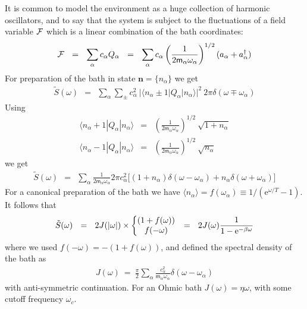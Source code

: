 \documentclass[onecolumn,fleqn, 11pt]{revtex4}
\newcommand{\eexp}{\mathrm{e}^}
\newcommand{\amatrix}[1]{\begin{matrix} #1 \end{matrix}}
\newcommand{\beq}{\begin{eqnarray}}
\newcommand{\eeq}{\end{eqnarray}}
\begin{document}
It is common to model the environment as a huge 
collection of harmonic oscillators, and to say that 
the system is subject to the fluctuations 
of a field variable ${\cal F}$ which is a linear 
combination of the bath coordinates: 
\beq
{\cal F} 
\ \ = \ \ 
\sum_{\alpha} c_{\alpha}Q_{\alpha} 
\ \ = \ \ 
\sum_{\alpha} c_{\alpha} 
\left(\frac{1}{2 \mathsf{m}_{\alpha} \omega_{\alpha}} \right)^{1/2} 
(a_{\alpha} + a_{\alpha}^{\dag})
\eeq
For preparation of the bath 
in state $\bm{n}=\{n_{\alpha}\}$
we get 
\beq
\tilde{S}(\omega)
\ \ = \ \ 
\sum_{\alpha}\sum_{\pm} 
c_{\alpha}^2
\ |\langle n_{\alpha}{\pm}1 | Q_{\alpha} | n_{\alpha} \rangle|^2 
\ 2\pi\delta(\omega\mp\omega_{\alpha})
\eeq
Using
\beq
\langle n_{\alpha}{+}1 | Q_{\alpha} | n_{\alpha} \rangle &=& 
\left(\frac{1}{2 \mathsf{m}_{\alpha} \omega_{\alpha}} \right)^{1/2}
\ \sqrt{1 + n_{\alpha}}
\\
\langle n_{\alpha}{-}1 | Q_{\alpha} | n_{\alpha} \rangle &=& 
\left( \frac{1}{2 \mathsf{m}_{\alpha} \omega_{\alpha}} \right)^{1/2}
\ \sqrt{n_{\alpha}}
\eeq
we get
\beq
\tilde{S}(\omega) 
\ \ = \ \
\sum_{\alpha} 
\frac{1}{2\mathsf{m}_{\alpha} \omega_{\alpha}}
2\pi c_{\alpha}^2  \Big[ 
(1 {+} n_{\alpha}) \delta(\omega-\omega_{\alpha})
+ n_{\alpha} \delta(\omega+\omega_{\alpha})
\Big]
\eeq
For a canonical preparation of the bath 
we have $\langle n_{\alpha} \rangle = f(\omega_{\alpha}) \equiv 1/(\eexp{\omega/T}-1)$. 
It follows that  
\beq
\tilde{S}(\omega) 
\ \ = \ \ 
2J(|\omega|) \times 
\left\{\amatrix{   
(1 + f(\omega)) \cr
f(-\omega) 
}\right. 
\ \ = \ \ 
2J(\omega)\frac{1}{1-\eexp{-\beta\omega}} 
\eeq
where we used ${f(-\omega)=-(1+f(\omega))}$, 
and defined the spectral density of the bath as 
\beq
J(\omega) \ = \ \frac{\pi}{2} \sum_{\alpha}
\frac{c_{\alpha}^2}{\mathsf{m}_{\alpha} \omega_{\alpha}}
\delta(\omega-\omega_{\alpha}) 
\eeq
with anti-symmetric continuation. 
For an Ohmic bath $J(\omega)=\eta\omega$,  
with some cutoff frequency $\omega_c$. 


 
\end{document}

